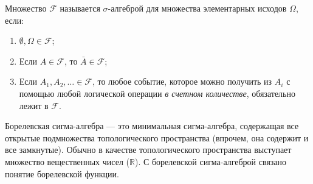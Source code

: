 \begin{definition}
	Множество $\mathcal{F}$ называется $\sigma$-алгеброй для множества элементарных исходов $\Omega$, если:
	\begin{enumerate}
		\item $\emptyset, \Omega \in \mathcal{F}$;
		\item Если $A \in \mathcal{F}$, то $\bar A \in \mathcal{F}$;
		\item Если $A_1, A_2, \dots \in \mathcal{F}$, то любое событие, которое можно получить из $A_i$ с помощью любой логической операции \textit{в счетном количестве}, обязательно лежит в $\mathcal{F}$.
	\end{enumerate}
\end{definition}

\begin{definition}
	Борелевская сигма-алгебра — это минимальная сигма-алгебра, содержащая все открытые подмножества топологического пространства (впрочем, она содержит и все замкнутые). Обычно в качестве топологического пространства выступает множество вещественных чисел ($\mathbb{R}$). С борелевской сигма-алгеброй связано понятие борелевской функции.
\end{definition}

